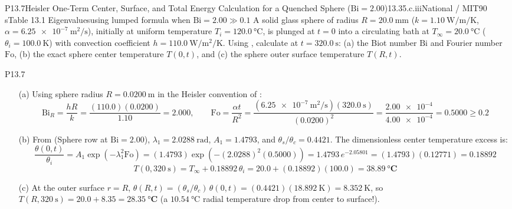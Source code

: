 \begin{problem}{P13.7}{Heisler One-Term Center, Surface, and Total Energy Calculation for a Quenched Sphere ($\mathrm{Bi} = 2.00$)}{13.3}{5.c.iii}{National / MIT}{90 s}{Table 13.1 Eigenvalues}{using lumped formula when $\mathrm{Bi} = 2.00 \gg 0.1$}
A solid glass sphere of radius $R = \SI{20.0}{\milli\meter}$ ($k = \SI{1.10}{\watt\per\meter\per\kelvin}$, $\alpha = \SI{6.25e-7}{\square\meter\per\second}$), initially at uniform temperature $T_i = \SI{120.0}{\celsius}$, is plunged at $t = 0$ into a circulating bath at $T_\infty = \SI{20.0}{\celsius}$ ($\theta_i = \SI{100.0}{\kelvin}$) with convection coefficient $h = \SI{110.0}{\watt\per\square\meter\per\kelvin}$. Using , calculate at $t = \SI{320.0}{\second}$: (a) the Biot number $\mathrm{Bi}$ and Fourier number $\mathrm{Fo}$, (b) the exact sphere center temperature $T(0,t)$, and (c) the sphere outer surface temperature $T(R,t)$.
\end{problem}
\begin{solution}{P13.7}
\begin{enumerate}
  \item[(a)] Using sphere radius $R = \SI{0.0200}{\meter}$ in the Heisler convention of :
  \[
    \mathrm{Bi}_R = \frac{h R}{k} = \frac{(110.0)(0.0200)}{1.10} = \mathbf{2.000}, \qquad
    \mathrm{Fo} = \frac{\alpha t}{R^2} = \frac{(\SI{6.25e-7}{\square\meter\per\second})(\SI{320.0}{\second})}{(0.0200)^2} = \frac{\num{2.00e-4}}{\num{4.00e-4}} = \mathbf{0.5000 \ge 0.2}
  \]
  \item[(b)] From  (Sphere row at $\mathrm{Bi} = 2.00$), $\lambda_1 = \SI{2.0288}{\radian}$, $A_1 = 1.4793$, and $\theta_s/\theta_c = 0.4421$. The dimensionless center temperature excess is:
  \[
    \frac{\theta(0,t)}{\theta_i} = A_1 \exp\!\left(-\lambda_1^2 \mathrm{Fo}\right) = (1.4793)\exp\!\left(-(2.0288)^2(0.5000)\right) = 1.4793\,e^{-2.05801} = (1.4793)(0.12771) = \mathbf{0.18892}
  \]
  \[
    T(0, \SI{320}{\second}) = T_\infty + 0.18892\,\theta_i = 20.0 + (0.18892)(100.0) = \mathbf{\SI{38.89}{\celsius}}
  \]
  \item[(c)] At the outer surface $r = R$, $\theta(R,t) = (\theta_s/\theta_c)\,\theta(0,t) = (0.4421)(\SI{18.892}{\kelvin}) = \SI{8.352}{\kelvin}$, so $T(R, \SI{320}{\second}) = 20.0 + 8.35 = \mathbf{\SI{28.35}{\celsius}}$ (a $\SI{10.54}{\celsius}$ radial temperature drop from center to surface!).
\end{enumerate}
\end{solution}

